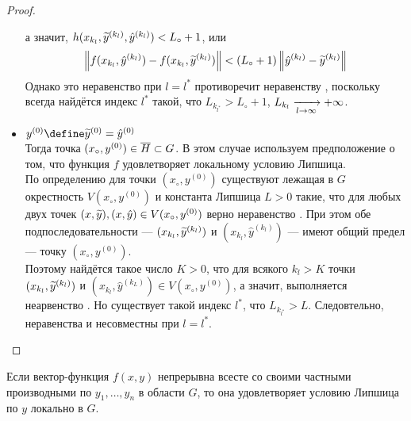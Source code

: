 \begin{proof}
\begin{itemize}
        а значит, $ h(x_{k_l}, \widetilde{y}^{(k_l)}, \hat{y}^{(k_l)}) < L_\circ + 1 $, или
        $$ \left\|{f(x_{k_l}, \hat{y}^{(k_l)}) - f(x_{k_l}, \widetilde{y}^{(k_l)})}\right\| < (L_\circ + 1)\left\|{\hat{y}^{(k_l)} - \widetilde{y}^{(k_l)}}\right\| $$
        Однако это неравенство при $ l = l^* $ противоречит неравенству , поскольку всегда найдётся индекс $ l^* $ такой, что $ L_{k_{l^*}} > L_\circ + 1 $, \as $ L_{k_l} \xrightarrow[{l} \to {\infty}]{} +\infty $.
        \item $ y^{(0)} \define \vawe{y}^{(0)} = \hat{y}^{(0)} $ \\
        Тогда точка $ (x_\circ, y^{(0)}) \in \overline H \subset G $. В этом случае используем предположение о том, что функция $ f $ удовлетворяет локальному условию Липшица. \\
        По определению для точки $ (x_\circ, y^{(0)}) $ существуют лежащая в $ G $ окрестность $ V(x_\circ, y^{(0)}) $ и константа Липшица $ L > 0 $ такие, что для любых двух точек $ (x, \widetilde y), (x, \hat y) \in V(x_\circ, y^{(0)}) $ верно неравенство . При этом обе подпоследовательности --- $ (x_{k_l}, \widetilde{y}^{(k_l)}) $ и $ (x_{k_l}, \hat{y}^{(k_l)}) $ --- имеют общий предел --- точку $ (x_\circ, y^{(0)}) $. \\
        Поэтому найдётся такое число $ K > 0 $, что для всякого $ k_l > K $ точки $ (x_{k_l}, \widetilde{y}^{(k_l)}) $ и $ (x_{k_l}, \hat{y}^{(k_L)}) \in V(x_\circ, y^{(0)}) $, а значит, выполняется неарвенство . Но существует такой индекс $ l^* $, что $ L_{k_{l^*}} > L $. Следовтельно, неравенства  и  несовместны при $ l = l^* $.
    \end{itemize}
\end{proof}

\begin{lemma}
	Если вектор-функция $ f(x, y) $ непрерывна всесте со своими частными производными по $ y_1, \dots, y_n $ в области $ G $, то она удовлетворяет условию Липшица по $ y $ локально в $ G $.
\end{lemma}

